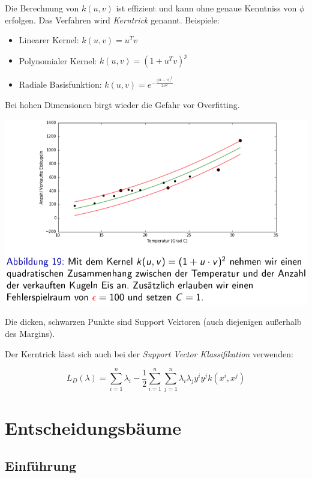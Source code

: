 \documentclass{report}
\begin{document}
Die Berechnung von $k(u, v)$ ist effizient und kann ohne genaue Kenntniss von $\phi$ erfolgen.
Das Verfahren wird \textit{Kerntrick} genannt. Beispiele:\\
\vspace*{-1.5em}
\begin{itemize}
  \item Linearer Kernel: $k(u, v) = u^Tv$
  \item Polynomialer Kernel: $k(u, v) = (1 + u^Tv)^p$
  \item Radiale Basisfunktion: $k(u, v) = e^{-\frac{||u-v||^2}{2\sigma^2}}$
\end{itemize}

Bei hohen Dimensionen birgt wieder die Gefahr vor Overfitting.

\begin{center}
  \includegraphics[scale=.295]{ml06_19}
\end{center}

Die dicken, schwarzen Punkte sind Support Vektoren (auch diejenigen außerhalb des Margins).

Der Kerntrick lässt sich auch bei der \textit{Support Vector Klassifikation} verwenden:

$$L_D(\lambda) = \sum_{i=1}^n\lambda_i - \frac{1}{2}\sum_{i=1}^n\sum_{j=1}^n\lambda_i\lambda_jy^iy^jk(x^i, x^j)$$

\chapter{Entscheidungsbäume}

\section{Einführung}
\end{document}
